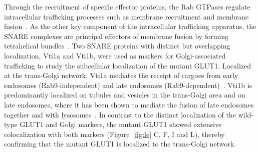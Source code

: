 Through the recruitment of specific effector proteins, the Rab GTPases regulate intracellular trafficking processes such as membrane recruitment and membrane fusion~\cite{Stenmark}. As the other key component of the intracellular trafficking apparatus, the SNARE complexes are principal effectors of membrane fusion by forming tetrahelical bundles~\cite{Stenmark,Chen,Ohya}. Two SNARE proteins with distinct but overlapping localization, Vti1a and Vti1b, were used as markers for Golgi-associated trafficking to study the subcellular localization of the mutant GLUT1. Localized at the trans-Golgi network, Vti1a mediates the receipt of cargoes from early endosomes (Rab9-independent) and late endosomes (Rab9-dependent)~\cite{Ganley}. Vti1b is predominantly localized on tubules and vesicles in the trans-Golgi area and on late endosomes, where it has been shown to mediate the fusion of late endosomes together and with lysosomes~\cite{Kreykenbohm,Antonin,Pryor}. In contrast to the distinct localization of the wild-type GLUT1 and Golgi markers, the mutant GLUT1 showed extensive colocalization with both markers (Figure~\ref{fig:le} C, F, I and L), thereby confirming that the mutant GLUT1 is localized to the trans-Golgi network.

